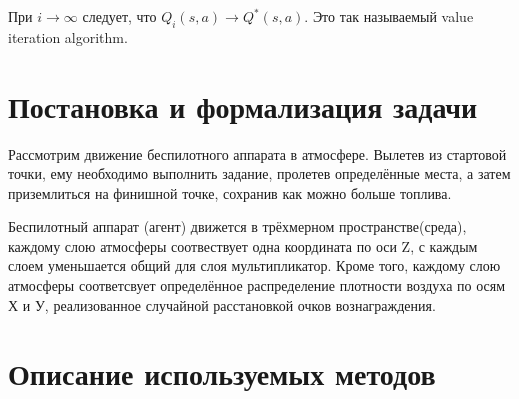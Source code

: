 \documentclass[12pt, a4paper]{report}
\theoremstyle{definition}
\theoremstyle{plain}
\theoremstyle{remark}
\theoremstyle{remark}
\theoremstyle{definition}
\begin{document}
При $i \rightarrow \infty$ следует, что $Q_{i}(s, a) \rightarrow Q^*(s, a)$. Это так называемый value iteration algorithm.


\section{Постановка и формализация задачи}

Рассмотрим движение беспилотного аппарата в атмосфере. Вылетев из стартовой точки, ему необходимо выполнить задание, пролетев определённые места, а затем приземлиться на финишной точке, сохранив как можно больше топлива.

Беспилотный аппарат (агент) движется в трёхмерном пространстве(среда), каждому слою атмосферы соотвествует одна координата по оси Z, с каждым слоем уменьшается общий для слоя мультипликатор. Кроме того, каждому слою атмосферы соответсвует определённое распределение плотности воздуха по осям Х и У, реализованное случайной расстановкой очков вознаграждения.


\section{Описание используемых методов}
\end{document}
